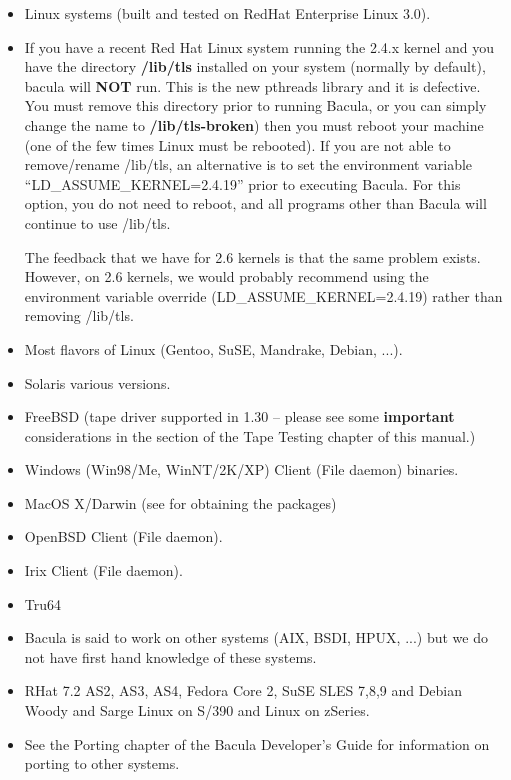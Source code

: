 \begin{itemize}
\item Linux systems (built and tested on RedHat Enterprise Linux 3.0).  
\item If you have a recent Red Hat Linux system running the 2.4.x kernel  and
   you have the directory {\bf /lib/tls} installed on your  system (normally by
   default), bacula will {\bf NOT} run. This is  the new pthreads library and it
is defective. You must remove  this directory prior to running Bacula, or you
can simply change  the name to {\bf /lib/tls-broken}) then you must reboot
your  machine (one of the few times Linux must be rebooted). If  you are not
able to remove/rename /lib/tls, an alternative is to  set the environment
variable ``LD\_ASSUME\_KERNEL=2.4.19'' prior to  executing Bacula. For this
option, you do not need to reboot, and  all programs other than Bacula will
continue to use /lib/tls.  

The feedback that we have for 2.6 kernels is that the  same problem exists.
However, on 2.6 kernels, we would  probably recommend using the environment
variable override  (LD\_ASSUME\_KERNEL=2.4.19) rather than removing /lib/tls. 

\item Most flavors of Linux (Gentoo, SuSE, Mandrake, Debian, ...).  
\item Solaris various versions.  
\item FreeBSD (tape driver supported in 1.30 -- please see some  {\bf
   important} considerations in the 
     section of the
   Tape Testing chapter of this manual.)  
\item Windows (Win98/Me, WinNT/2K/XP) Client (File daemon) binaries.  
\item MacOS X/Darwin (see  for
   obtaining the packages)  
\item OpenBSD Client (File daemon).  
\item Irix Client (File daemon).  
\item Tru64  
\item Bacula is said to work on other systems (AIX, BSDI, HPUX,  ...) but we
   do not have first hand knowledge  of these systems. 
\item  RHat 7.2 AS2, AS3, AS4, Fedora Core 2, SuSE SLES 7,8,9 and Debian Woody and Sarge Linux on
   S/390 and Linux on zSeries.
\item See the Porting chapter of the Bacula Developer's Guide  for information
   on porting to other systems. 
   \end{itemize}
